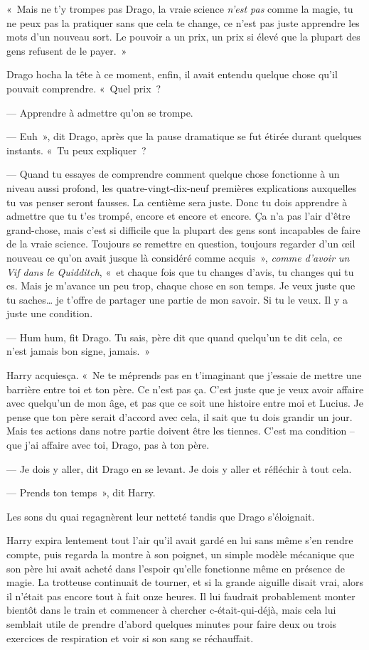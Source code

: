 «~Mais ne t'y trompes pas Drago, la vraie science \emph{n'est pas} comme la magie, tu ne peux pas la pratiquer sans que cela te change, ce n'est pas juste apprendre les mots d'un nouveau sort.
Le pouvoir a un prix, un prix si élevé que la plupart des gens refusent de le payer.~»

Drago hocha la tête à ce moment, enfin, il avait entendu quelque chose qu'il pouvait comprendre.  «~Quel prix~?

--- Apprendre à admettre qu'on se trompe.

--- Euh~», dit Drago, après que la pause dramatique se fut étirée durant quelques instants. «~Tu peux expliquer~?

--- Quand tu essayes de comprendre comment quelque chose fonctionne à un niveau aussi profond, les quatre-vingt-dix-neuf premières explications auxquelles tu vas penser seront fausses.
La centième sera juste.
Donc tu dois apprendre à admettre que tu t'es trompé, encore et encore et encore.
Ça n'a pas l'air d'être grand-chose, mais c'est si difficile que la plupart des gens sont incapables de faire de la vraie science.
Toujours se remettre en question, toujours regarder d'un œil nouveau ce qu'on avait jusque là considéré comme acquis~»,
\emph{comme d'avoir un Vif dans le Quidditch}, «~et chaque fois que tu changes d'avis, tu changes qui tu es.
Mais je m'avance un peu trop, chaque chose en son temps.
Je veux juste que tu saches… je t'offre de partager une partie de mon savoir.
Si tu le veux. Il y a juste une condition.

--- Hum hum, fit Drago. Tu sais, père dit que quand quelqu'un te dit cela, ce n'est jamais bon signe, jamais.~»

Harry acquiesça.
«~Ne te méprends pas en t'imaginant que j'essaie de mettre une barrière entre toi et ton père.
Ce n'est pas ça.
C'est juste que je veux avoir affaire avec quelqu'un de mon âge, et pas que ce soit une histoire entre moi et Lucius.
Je pense que ton père serait d'accord avec cela, il sait que tu dois grandir un jour.
Mais tes actions dans notre partie doivent être les tiennes.
C'est ma condition -- que j'ai affaire avec toi, Drago, pas à ton père.

--- Je dois y aller, dit Drago en se levant. Je dois y aller et réfléchir à tout cela.

--- Prends ton temps~», dit Harry.

Les sons du quai regagnèrent leur netteté tandis que Drago s'éloignait.

Harry expira lentement tout l'air qu'il avait gardé en lui sans même s'en rendre compte, puis regarda la montre à son poignet, un simple modèle mécanique que son père lui avait acheté dans l'espoir qu'elle fonctionne même en présence de magie.
La trotteuse continuait de tourner, et si la grande aiguille disait vrai, alors il n'était pas encore tout à fait onze heures.
Il lui faudrait probablement monter bientôt dans le train et commencer à chercher c-était-qui-déjà, mais cela lui semblait utile de prendre d'abord quelques minutes pour faire deux ou trois exercices de respiration et voir si son sang se réchauffait.

